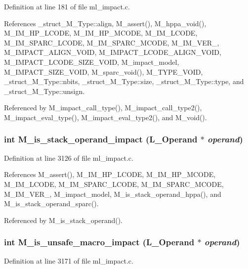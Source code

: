 Definition at line 181 of file ml\_\-impact.c.

References \_\-struct\_\-M\_\-Type::align, M\_\-assert(), M\_\-hppa\_\-void(), M\_\-IM\_\-HP\_\-LCODE, M\_\-IM\_\-HP\_\-MCODE, M\_\-IM\_\-LCODE, M\_\-IM\_\-SPARC\_\-LCODE, M\_\-IM\_\-SPARC\_\-MCODE, M\_\-IM\_\-VER\_, M\_\-IMPACT\_\-ALIGN\_\-VOID, M\_\-IMPACT\_\-LCODE\_\-ALIGN\_\-VOID, M\_\-IMPACT\_\-LCODE\_\-SIZE\_\-VOID, M\_\-impact\_\-model, M\_\-IMPACT\_\-SIZE\_\-VOID, M\_\-sparc\_\-void(), M\_\-TYPE\_\-VOID, \_\-struct\_\-M\_\-Type::nbits, \_\-struct\_\-M\_\-Type::size, \_\-struct\_\-M\_\-Type::type, and \_\-struct\_\-M\_\-Type::unsign.

Referenced by M\_\-impact\_\-call\_\-type(), M\_\-impact\_\-call\_\-type2(), M\_\-impact\_\-eval\_\-type(), M\_\-impact\_\-eval\_\-type2(), and M\_\-void().
\subsubsection{\setlength{\rightskip}{0pt plus 5cm}int M\_\-is\_\-stack\_\-operand\_\-impact (L\_\-Operand $\ast$ {\em operand})}\label{m__impact_8h_033087e5c0e736026c15df60df03d092}




Definition at line 3126 of file ml\_\-impact.c.

References M\_\-assert(), M\_\-IM\_\-HP\_\-LCODE, M\_\-IM\_\-HP\_\-MCODE, M\_\-IM\_\-LCODE, M\_\-IM\_\-SPARC\_\-LCODE, M\_\-IM\_\-SPARC\_\-MCODE, M\_\-IM\_\-VER\_, M\_\-impact\_\-model, M\_\-is\_\-stack\_\-operand\_\-hppa(), and M\_\-is\_\-stack\_\-operand\_\-sparc().

Referenced by M\_\-is\_\-stack\_\-operand().
\subsubsection{\setlength{\rightskip}{0pt plus 5cm}int M\_\-is\_\-unsafe\_\-macro\_\-impact (L\_\-Operand $\ast$ {\em operand})}\label{m__impact_8h_22fa0d2a24d08297ee923a6cffc326f3}




Definition at line 3171 of file ml\_\-impact.c.

